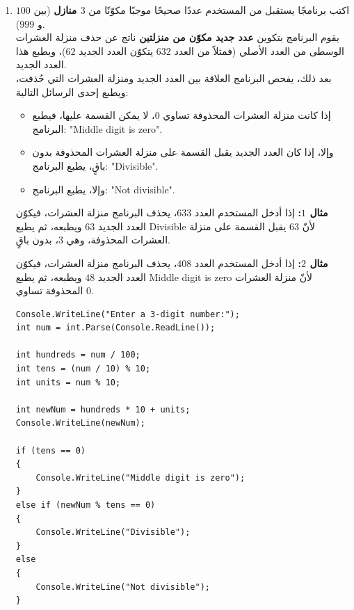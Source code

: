 \documentclass[14pt]{extarticle}
\begin{document}
\begin{enumerate}[resume, itemsep=2.2em]
\item
اكتب برنامجًا يستقبل من المستخدم عددًا صحيحًا موجبًا مكوّنًا من \textbf{$3$ منازل} (بين $100$ و $999$). \\
يقوم البرنامج بتكوين \textbf{عدد جديد مكوّن من منزلتين} ناتج عن حذف منزلة العشرات الوسطى من العدد الأصلي (فمثلاً من العدد $632$ يتكوّن العدد الجديد $62$)، ويطبع هذا العدد الجديد. \\
بعد ذلك، يفحص البرنامج العلاقة بين العدد الجديد ومنزلة العشرات التي حُذفت، ويطبع إحدى الرسائل التالية:
\begin{itemize}[nosep]
    \item إذا كانت منزلة العشرات المحذوفة تساوي $0$، لا يمكن القسمة عليها، فيطبع البرنامج: \textenglish{"Middle digit is zero"}.
    \item وإلا، إذا كان العدد الجديد يقبل القسمة على منزلة العشرات المحذوفة بدون باقٍ، يطبع البرنامج: \textenglish{"Divisible"}.
    \item وإلا، يطبع البرنامج: \textenglish{"Not divisible"}.
\end{itemize}

\textbf{مثال $1$:} إذا أدخل المستخدم العدد $633$، يحذف البرنامج منزلة العشرات، فيكوّن العدد الجديد $63$ ويطبعه، ثم يطبع \textenglish{Divisible} لأنّ $63$ يقبل القسمة على منزلة العشرات المحذوفة، وهي $3$، بدون باقٍ.

\textbf{مثال $2$:} إذا أدخل المستخدم العدد $408$، يحذف البرنامج منزلة العشرات، فيكوّن العدد الجديد $48$ ويطبعه، ثم يطبع \textenglish{Middle digit is zero} لأنّ منزلة العشرات المحذوفة تساوي $0$.

\ifwithsols
\begin{boxSolution}
\begin{english}
\begin{verbatim}
Console.WriteLine("Enter a 3-digit number:");
int num = int.Parse(Console.ReadLine());

int hundreds = num / 100;
int tens = (num / 10) % 10;
int units = num % 10;

int newNum = hundreds * 10 + units;
Console.WriteLine(newNum);

if (tens == 0)
{
    Console.WriteLine("Middle digit is zero");
}
else if (newNum % tens == 0)
{
    Console.WriteLine("Divisible");
}
else
{
    Console.WriteLine("Not divisible");
}
\end{verbatim}
\end{english}
\end{boxSolution}
\fi
\filbreak


\end{enumerate}
\end{document}
